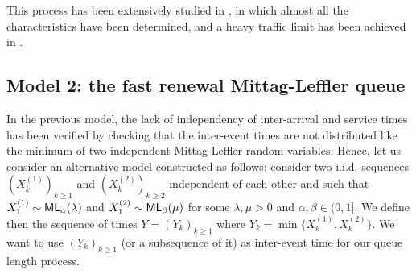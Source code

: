 \documentclass[]{amsart}
\numberwithin{equation}{section}
\theoremstyle{remark}
\theoremstyle{definition}
\DeclareMathOperator{\bP}{\mathbb{P}}
\begin{document}
This process has been extensively studied in \cite{cahoy2015transient,ascione2018fractional,ascione2022skorokhod,butt2023queuing}, in which almost all the characteristics have been determined, and a heavy traffic limit has been achieved in \cite{ascione2022skorokhod}.
\subsection{Model 2: the fast renewal Mittag-Leffler queue}\label{Sec:model2}
In the previous model, the lack of independency of inter-arrival and service times has been verified by checking that the inter-event times are not distributed like the minimum of two independent Mittag-Leffler random variables. Hence, let us consider an alternative model  constructed as follows: consider two i.i.d. sequences $(X^{(1)}_k)_{k \ge 1}$ and $(X^{(2)}_k)_{k \ge 2}$ independent of each other and such that $X^{(1)}_1 \sim {\sf ML}_\alpha(\lambda)$ and $X^{(2)}_1 \sim {\sf ML}_\beta(\mu)$ for some $\lambda,\mu>0$ and $\alpha,\beta \in (0,1]$. We define then the sequence of times $Y=(Y_k)_{k \ge 1}$ where $Y_k=\min\{X^{(1)}_k,X^{(2)}_k\}$. We want to use $(Y_k)_{k \ge 1}$ (or a subsequence of it) as inter-event time for our queue length process.
\end{document}
